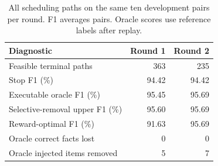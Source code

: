 \begin{table}[t]
\centering
\caption{All scheduling paths on the same ten development pairs per round. F1 averages pairs. Oracle scores use reference labels after replay.}
\label{tab:offline_loop_ceiling}
\footnotesize
\begin{tabular}{lrr}
\toprule
Diagnostic & Round 1 & Round 2 \\
\midrule
Feasible terminal paths & 363 & 235 \\
Stop F1 (\%) & 94.42 & 94.42 \\
Executable oracle F1 (\%) & 95.45 & 95.69 \\
Selective-removal upper F1 (\%) & 95.60 & 95.69 \\
Reward-optimal F1 (\%) & 91.63 & 95.69 \\
Oracle correct facts lost & 0 & 0 \\
Oracle injected items removed & 5 & 7 \\
\bottomrule
\end{tabular}
\end{table}
